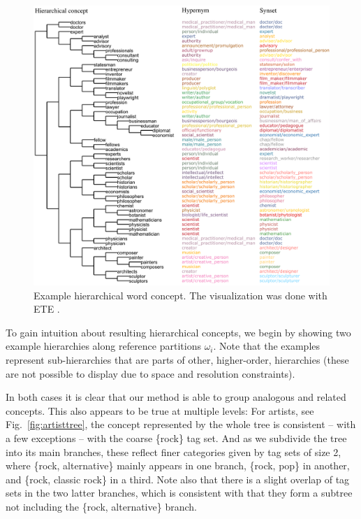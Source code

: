 \documentclass[conference]{IEEEtran}
\newcommand{\fig}[1]{Fig.\ \ref{#1}}
\begin{document}
\begin{figure}
\begin{center}
\includegraphics[width=1.7\columnwidth]{figures/word-hierarchy-example.pdf}
\end{center}
\caption{Example hierarchical word concept. The visualization was done with ETE \cite{HuertaCepas16}.}
\label{fig:wordtree}
\end{figure}

To gain intuition about resulting hierarchical concepts, we begin by showing two example hierarchies along 
reference partitions $\omega_i$. Note that the examples represent sub-hierarchies that are parts of other, higher-order,
hierarchies (these are not possible to display due to space and resolution constraints).

In both cases it is clear that our method is able to group analogous and related concepts. This also appears to 
be true at multiple levels: For artists, see \fig{fig:artisttree}, the concept represented by the whole tree is consistent -- with a few exceptions --
with the coarse \{rock\} tag set. And as we subdivide the tree into its main branches, these reflect finer categories
given by tag sets of size 2, where \{rock, alternative\} mainly appears in one branch, \{rock, pop\} in another,
and \{rock, classic rock\} in a third. Note also that there is a slight overlap of tag sets in the two latter branches, 
which is consistent with that they form a subtree not including the \{rock, alternative\} branch.
\end{document}
